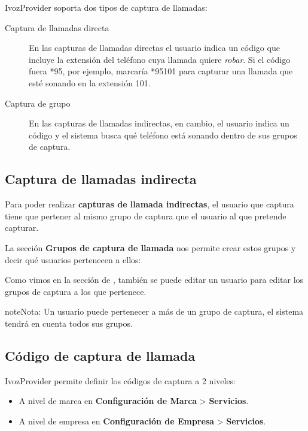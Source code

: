\documentclass[letterpaper,10pt,spanish]{sphinxmanual}
\begin{document}
IvozProvider soporta dos tipos de captura de llamadas:
\begin{description}
\item[{Captura de llamadas directa}] \leavevmode{}\label{pbx_features/call_captures:term-direct-pickup}
En las capturas de llamadas directas el usuario indica un código que incluye la extensión del teléfono cuya llamada quiere \emph{robar}. Si el código fuera *95, por ejemplo, marcaría *95101 para capturar una llamada que esté sonando en la extensión 101.

\item[{Captura de grupo}] \leavevmode{}\label{pbx_features/call_captures:term-group-pickup}
En las capturas de llamadas indirectas, en cambio, el usuario indica un código y el sistema busca qué teléfono está sonando dentro de sus grupos de captura.

\end{description}


\subsection{Captura de llamadas indirecta}
\label{pbx_features/call_captures:call-pickup-groups}
Para poder realizar \textbf{capturas de llamada indirectas}, el usuario que captura tiene que pertener al mismo grupo de captura que el usuario al que pretende capturar.

La sección \textbf{Grupos de captura de llamada} nos permite crear estos grupos y decir qué usuarios pertenecen a ellos:

\noindent{}

Como vimos en la sección de {\hyperref[pbx_features/users:users]{}}, también se puede editar un usuario para editar los grupos de captura a los que pertenece.

\begin{notice}{note}{Nota:}
Un usuario puede pertenecer a más de un grupo de captura, el sistema tendrá en cuenta todos sus grupos.
\end{notice}


\subsection{Código de captura de llamada}
\label{pbx_features/call_captures:group-pickup-service-code}
IvozProvider permite definir los códigos de captura a 2 niveles:
\begin{itemize}
\item {} 
A nivel de marca en \textbf{Configuración de Marca} \textgreater{} \textbf{Servicios}.

\item {} 
A nivel de empresa en \textbf{Configuración de Empresa} \textgreater{} \textbf{Servicios}.

\end{itemize}
\end{document}
